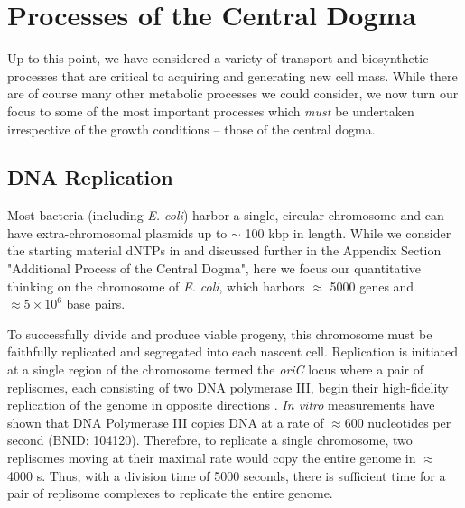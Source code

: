\section{Processes of the Central Dogma}
Up to this point, we have considered a variety of transport and biosynthetic
processes that are critical to acquiring and generating new cell mass. While
there are of course many other metabolic processes we could consider, we now
turn our focus to some of the most important processes which \textit{must} be
undertaken irrespective of the growth conditions -- those of the central
dogma.

\subsection{DNA Replication}
Most bacteria (including \textit{E. coli}) harbor a single, circular chromosome
and can have extra-chromosomal plasmids up to $\sim$ 100 kbp in length. While
we consider the starting material dNTPs in  and
discussed further in the Appendix Section "Additional Process of the Central Dogma", here we focus
our quantitative thinking on the chromosome of \textit{E. coli}, which
harbors $\approx$ 5000 genes and $\approx 5\times 10^6$ base pairs.

To successfully divide and produce viable progeny, this chromosome must be
faithfully replicated and segregated into each nascent cell. Replication is
initiated at a single region of the chromosome termed the \textit{oriC} locus
where a pair of replisomes, each consisting of two DNA polymerase III,
begin their high-fidelity replication of the genome in opposite directions
\citep{fijalkowska2012}. \textit{In vitro} measurements have shown that DNA
Polymerase III copies DNA at a rate of $\approx 600$ nucleotides per second
(BNID: 104120). Therefore, to replicate a single chromosome, two replisomes
moving at their maximal rate would copy the entire genome in $\approx$ 4000
s. Thus, with a division time of 5000 seconds, there is sufficient time for a pair
of replisome complexes to replicate the entire genome.

